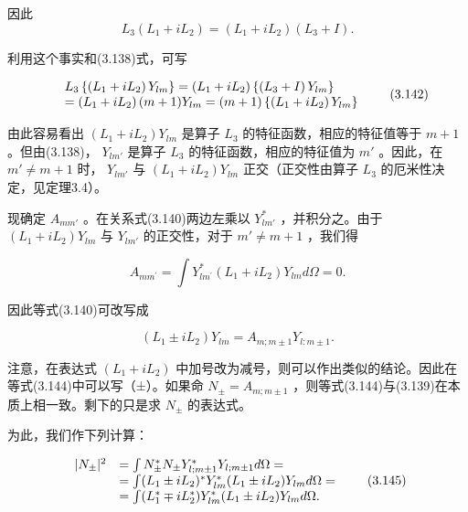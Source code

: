 因此
\begin{equation*}
L _ {3} \left(L _ {1} + i L _ {2}\right) = \left(L _ {1} + i L _ {2}\right) \left(L _ {3} + I\right).\tag{3.141}
\end{equation*}

利用这个事实和(3.138)式，可写

\begin{equation*}
\begin{array}{r l} & L _ {3} \left\{\left(L _ {1} + i L _ {2}\right) Y _ {l m} \right\} = \left(L _ {1} + i L _ {2}\right) \left\{\left(L _ {3} + I\right) Y _ {l m} \right\} \\ & = \left(L _ {1} + i L _ {2}\right) (m + 1) Y _ {l m} = (m + 1) \left\{\left(L _ {1} + i L _ {2}\right) Y _ {l m} \right\} \end{array}\tag{3.142}
\end{equation*}

由此容易看出 $(L_{1} + iL_{2})Y_{lm}$ 是算子 $L_{3}$ 的特征函数，相应的特征值等于 $m + 1$ 。但由(3.138)， $Y_{lm'}$ 是算子 $L_{3}$ 的特征函数，相应的特征值为 $m'$ 。因此，在 $m' \neq m + 1$ 时， $Y_{lm'}$ 与 $(L_{1} + iL_{2})Y_{lm}$ 正交（正交性由算子 $L_{3}$ 的厄米性决定，见定理3.4）。

现确定 $A_{mm'}$ 。在关系式(3.140)两边左乘以 $Y_{lm'}^*$ ，并积分之。由于 $(L_1 + iL_2)Y_{lm}$ 与 $Y_{lm'}$ 的正交性，对于 $m' \neq m + 1$ ，我们得

\begin{equation*}
A _ {m m ^ {\prime}} = \int Y _ {l m ^ {\prime}} ^ {*} (L _ {1} + i L _ {2}) Y _ {l m} d \Omega = 0.\tag{3.143}
\end{equation*}

因此等式(3.140)可改写成

\begin{equation*}
\left(L _ {1} \pm i L _ {2}\right) Y _ {l m} = A _ {m; m \pm 1} Y _ {l: m \pm 1}.\tag{3.144}
\end{equation*}

注意，在表达式 $(L_{1} + iL_{2})$ 中加号改为减号，则可以作出类似的结论。因此在等式(3.144)中可以写（±）。如果命 $N_{\pm} = A_{m;m\pm 1}$ ，则等式(3.144)与(3.139)在本质上相一致。剩下的只是求 $N_{\pm}$ 的表达式。

为此，我们作下列计算：

\begin{equation*}
\begin{array}{r l} | N _ {\pm} | ^ {2} & = \int N _ {\pm} ^ {*} N _ {\pm} Y _ {l; m \pm 1} ^ {*} Y _ {l; m \pm 1} d \Omega = \\ & = \int (L _ {1} \pm i L _ {2}) ^ {*} Y _ {l m} ^ {*} (L _ {1} \pm i L _ {2}) Y _ {l m} d \Omega = \\ & = \int (L _ {1} ^ {*} \mp i L _ {2} ^ {*}) Y _ {l m} ^ {*} (L _ {1} \pm i L _ {2}) Y _ {l m} d \Omega . \end{array}\tag{3.145}
\end{equation*}

